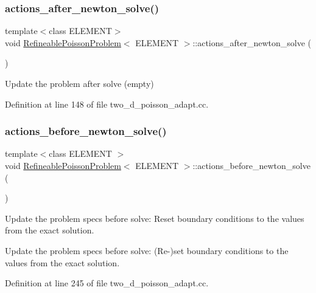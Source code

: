 \subsubsection{\texorpdfstring{actions\+\_\+after\+\_\+newton\+\_\+solve()}{actions\_after\_newton\_solve()}}
{\footnotesize\ttfamily template$<$class E\+L\+E\+M\+E\+NT$>$ \\
void \hyperlink{classRefineablePoissonProblem}{Refineable\+Poisson\+Problem}$<$ E\+L\+E\+M\+E\+NT $>$\+::actions\+\_\+after\+\_\+newton\+\_\+solve (\begin{DoxyParamCaption}{ }\end{DoxyParamCaption})\hspace{0.3cm}{\ttfamily [inline]}}



Update the problem after solve (empty) 



Definition at line 148 of file two\+\_\+d\+\_\+poisson\+\_\+adapt.\+cc.

\mbox{\label{classRefineablePoissonProblem_a883906ab6c06ffa10ed55dc4fc02ce96}} 
\subsubsection{\texorpdfstring{actions\+\_\+before\+\_\+newton\+\_\+solve()}{actions\_before\_newton\_solve()}}
{\footnotesize\ttfamily template$<$class E\+L\+E\+M\+E\+NT $>$ \\
void \hyperlink{classRefineablePoissonProblem}{Refineable\+Poisson\+Problem}$<$ E\+L\+E\+M\+E\+NT $>$\+::actions\+\_\+before\+\_\+newton\+\_\+solve (\begin{DoxyParamCaption}{ }\end{DoxyParamCaption})}



Update the problem specs before solve\+: Reset boundary conditions to the values from the exact solution. 

Update the problem specs before solve\+: (Re-\/)set boundary conditions to the values from the exact solution. 

Definition at line 245 of file two\+\_\+d\+\_\+poisson\+\_\+adapt.\+cc.



